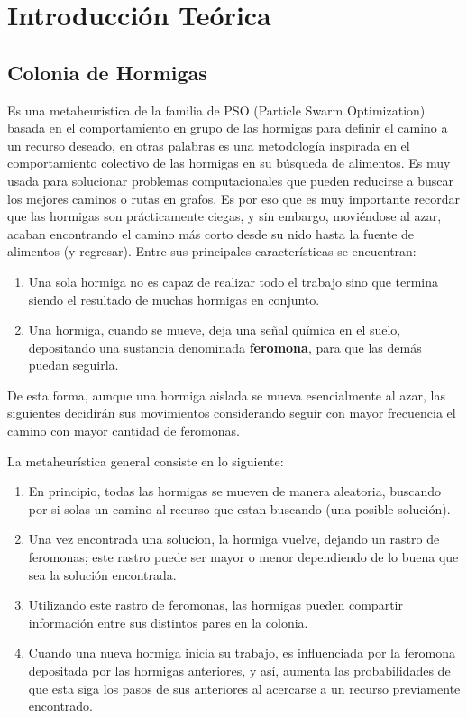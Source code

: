 \newpage
\section{Introducción Teórica}\label{sec:introduccion}
\subsection{Colonia de Hormigas}
Es una metaheuristica de la familia de PSO (Particle Swarm Optimization) basada en el comportamiento en grupo de las hormigas para definir el camino a un recurso deseado, en otras palabras es una metodología inspirada en el comportamiento colectivo de las hormigas en su búsqueda de alimentos. 
Es muy usada para solucionar problemas computacionales que pueden reducirse a buscar los mejores caminos o rutas en grafos. Es por eso que es muy importante recordar que las hormigas son prácticamente ciegas, y sin embargo, moviéndose al azar, acaban encontrando el camino más corto desde su nido hasta la fuente de alimentos (y regresar).
Entre sus principales características se encuentran:

\begin{enumerate}
\item Una sola hormiga no es capaz de realizar todo el trabajo sino que termina siendo el resultado de muchas hormigas en conjunto.
\item Una hormiga, cuando se mueve, deja una señal química en el suelo, depositando una sustancia denominada \textbf{feromona}, para que las demás puedan seguirla.
\end{enumerate}

De esta forma, aunque una hormiga aislada se mueva esencialmente al azar, las siguientes decidirán sus movimientos considerando seguir con mayor frecuencia el camino con mayor cantidad de feromonas.

La metaheurística general consiste en lo siguiente:
\begin{enumerate}
\item En principio, todas las hormigas se mueven de manera aleatoria, buscando por si solas un camino al recurso que estan buscando (una posible solución).
\item Una vez encontrada una solucion, la hormiga vuelve, dejando un rastro de feromonas; este rastro puede ser mayor o menor dependiendo de lo buena que sea la solución encontrada. 
\item Utilizando este rastro de feromonas, las hormigas pueden compartir información entre sus distintos pares en la colonia.
\item Cuando una nueva hormiga inicia su trabajo, es influenciada por la feromona depositada por las hormigas anteriores, y así, aumenta las probabilidades de que esta siga los pasos de sus anteriores
al acercarse a un recurso previamente encontrado.
\end{enumerate}



